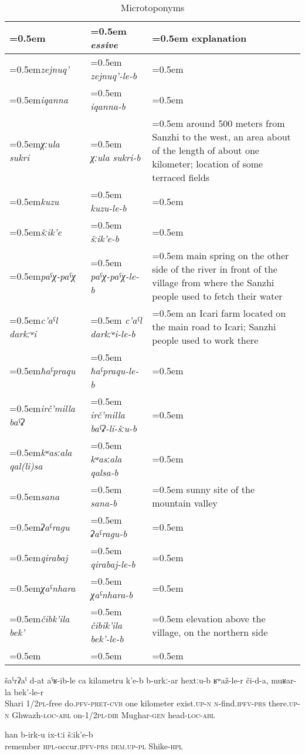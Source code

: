 \begin{table}
	\caption{Microtoponyms}
	\label{tab:Microtoponyms}
	\small
	\begin{tabularx}{0.98\textwidth}[]{%
		>{\raggedright\arraybackslash\hangindent=0.5em\itshape}p{60pt}
		>{\raggedright\arraybackslash\hangindent=0.5em\itshape}p{85pt}
		>{\raggedright\arraybackslash\hangindent=0.5em}X}
		
		\lsptoprule
		\upshape \isit{microtoponym}	&	\upshape essive 	&	explanation\\
		\midrule
		zejnuq' 		&	zejnuq'-le-b 		&	\\
		iqanna		&	iqanna-b		&	\\
		χːula sukri		&	χːula sukri-b		&	around 500 meters from Sanzhi to the west, an area about of the length of about one kilometer; location of some terraced fields\\
		kuzu			&	kuzu-le-b		&	\\
		šːik'e			&	šːik'e-b		&	\\
		paˁχ-paˁχ		&	paˁχ-paˁχ-le-b 	&	main spring on the other side of the river in front of the village from where the Sanzhi people used to fetch their water\\ 
		c'aˁl darkːʷi 		&	c'aˁl darkːʷi-le-b	&	an Icari farm located on the main road to Icari; Sanzhi people used to work there\\
		ħaˁpraqu 		&	ħaˁpraqu-le-b	&	\\
		irč'milla baˁʡ		&	irč'milla baˁʡ-li-šːu-b	&	\\
		kʷasːala qal(li)sa	&	kʷasːala qalsa-b 	&	\\
		sana			&	sana-b		&	sunny site of the mountain valley\\
		ʡaˁragu 		&	ʡaˁragu-b		&	\\
		qirabaj		&	qirabaj-le-b		&	\\
		χaˁnhara 		&	χaˁnhara-b		&	\\
		čibk'ila bek'		&	čibik'ila bek'-le-b	&	elevation above the village, on the northern side\\
		\lspbottomrule
	\end{tabularx}
\end{table}

\begin{exe}
	\ex	\label{ex:They sent us to Shari it is probably one kilometer}
	\gll	šaˁrʡaˁ	d-at	aˁʁ-ib-le	ca	kilametru	k'e-b	b-urkː-ar	hextːu-b		ʁʷaž-le-r	či-d-a,	muʁar-la	bek'-le-r   \\
		Shari	1/2\textsc{pl}-free	do.\textsc{pfv-pret-cvb}		one	kilometer	exist.\textsc{up-n}	\textsc{n}-find.\textsc{ipfv-prs}	there.\textsc{up-n}	Ghwazh-\textsc{loc-abl}	on-1/2\textsc{pl-dir} Mughar-\textsc{gen}	head-\textsc{loc-abl}\\
	\glt	{}

	\ex	\label{ex:As I remember they were in Shike}
	\gll	han b-irk-u	ix-tːi	šːik'e-b  \\
		remember \textsc{hpl}-occur.\textsc{ipfv-prs}	\textsc{dem.up}-\textsc{pl}	Shike-\textsc{hpl}\\
	\glt	{}
\end{exe}
